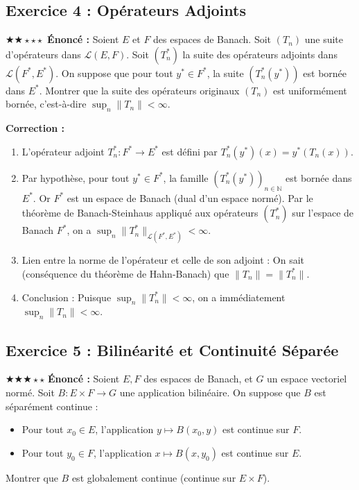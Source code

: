 \documentclass[11pt,a4paper]{article}
\begin{document}
\subsection*{Exercice 4 : Opérateurs Adjoints}
$\bigstar\bigstar\star\star\star$
\textbf{Énoncé :}
Soient $E$ et $F$ des espaces de Banach. Soit $(T_n)$ une suite d'opérateurs dans $\mathcal{L}(E, F)$.
Soit $(T_n^*)$ la suite des opérateurs adjoints dans $\mathcal{L}(F^*, E^*)$.
On suppose que pour tout $y^* \in F^*$, la suite $(T_n^*(y^*))$ est bornée dans $E^*$.
Montrer que la suite des opérateurs originaux $(T_n)$ est uniformément bornée, c'est-à-dire $\sup_n \|T_n\| < \infty$.

\textbf{Correction :}
\begin{enumerate}
\item L'opérateur adjoint $T_n^* : F^* \to E^*$ est défini par $T_n^*(y^*)(x) = y^*(T_n(x))$.
\item Par hypothèse, pour tout $y^* \in F^*$, la famille $(T_n^*(y^*))_{n \in \mathbb{N}}$ est bornée dans $E^*$.
   Or $F^*$ est un espace de Banach (dual d'un espace normé).
   Par le théorème de Banach-Steinhaus appliqué aux opérateurs $(T_n^*)$ sur l'espace de Banach $F^*$, on a $\sup_n \|T_n^*\|_{\mathcal{L}(F^*, E^*)} < \infty$.
\item Lien entre la norme de l'opérateur et celle de son adjoint :
   On sait (conséquence du théorème de Hahn-Banach) que $\|T_n\| = \|T_n^*\|$.
\item Conclusion :
   Puisque $\sup_n \|T_n^*\| < \infty$, on a immédiatement $\sup_n \|T_n\| < \infty$.
\end{enumerate}
\vspace{1cm}
\subsection*{Exercice 5 : Bilinéarité et Continuité Séparée}
$\bigstar\bigstar\bigstar\star\star$
\textbf{Énoncé :}
Soient $E, F$ des espaces de Banach, et $G$ un espace vectoriel normé.
Soit $B : E \times F \to G$ une application bilinéaire.
On suppose que $B$ est séparément continue :
\begin{itemize}
\item Pour tout $x_0 \in E$, l'application $y \mapsto B(x_0, y)$ est continue sur $F$.
\item Pour tout $y_0 \in F$, l'application $x \mapsto B(x, y_0)$ est continue sur $E$.
\end{itemize}
Montrer que $B$ est globalement continue (continue sur $E \times F$).
\end{document}
